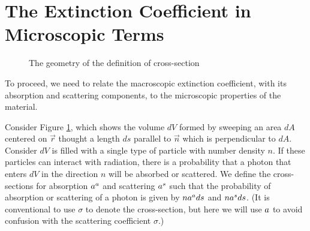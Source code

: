 \newslide

\section{The Extinction Coefficient in Microscopic Terms}

\begin{figure}
\begin{center}
\end{center}
\caption{The geometry of the definition of cross-section}
\label{fig-cross-section}
\end{figure}

To proceed, we need to relate the macroscopic extinction coefficient, with its absorption and scattering components, to the microscopic properties of the material. 

Consider Figure \ref{fig-cross-section}, which shows the
volume $dV$ formed by sweeping an area $dA$ centered on
$\vec r$ thought a length $ds$ parallel to $\vec n$ which is
perpendicular to $dA$. Consider $dV$ is filled with a single type of particle with number density $n$. If these particles can interact with radiation, there is a probability that a photon that enters $dV$ in the direction $n$ will be absorbed or scattered. We define the cross-sections for absorption $a^a$ and scattering $a^s$ such that the probability of absorption or scattering of a photon is given by $n a^ads$ and $na^sds$. (It is conventional to use $\sigma$ to denote the cross-section, but here we will use $a$ to avoid confusion with the scattering coefficient $\sigma$.)

